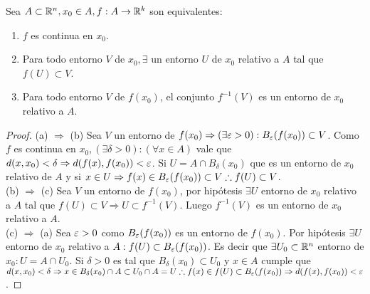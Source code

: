 \begin{prop}
  Sea \(A \subset \mathbb{R}^n, x_0 \in A, f: A \to \mathbb{R}^k\) son equivalentes:
  \begin{enumerate}
    \item \(f\) es continua en \(x_0\).
    \item Para todo entorno \(V\) de \(x_0, \exists \) un entorno \(U\) de \(x_0\) relativo a \(A\) tal que \(f(U) \subset V\).
    \item Para todo entorno \(V\) de \(f(x_0)\), el conjunto \(f^{-1}(V)\) es un entorno de \(x_0\) relativo a \(A\).
  \end{enumerate}

  \begin{proof}
    (a) \(\Rightarrow \) (b) Sea \(V\) un entorno de \(f(x_0) \Rightarrow (\exists \varepsilon > 0) : B_{\varepsilon}(f(x_0)) \subset V\). Como \(f\) es continua en \(x_0, (\exists \delta > 0) : (\forall x \in A)\) vale que \(d(x, x_0) < \delta \Rightarrow d(f(x), f(x_0)) < \varepsilon \). Si \(U = A \cap B_{\delta}(x_0)\) que es un entorno de \(x_0\) relativo de \(A\) y si \(x \in U \Rightarrow f(x) \in B_{\varepsilon}(f(x_0)) \subset V \therefore f(U) \subset V\). \\
    (b) \(\Rightarrow \) (c) Sea \(V\) un entorno de \(f(x_0)\), por hipótesis \(\exists U\) entorno de \(x_0\) relativo a \(A\) tal que \(f(U) \subset V \Rightarrow U \subset f^{-1}(V)\). Luego \(f^{-1}(V)\) es un entorno de \(x_0\) relativo a \(A\). \\
    (c) \(\Rightarrow \) (a) Sea \(\varepsilon > 0\) como \(B_{\varepsilon}(f(x_0))\) es un entorno de \(f(x_0)\). Por hipótesis \(\exists U\) entorno de \(x_0\) relativo a \(A : f(U) \subset B_{\varepsilon}(f(x_0))\). Es decir que \(\exists U_0 \subset \mathbb{R}^n\) entorno de \(x_0 : U = A \cap U_0\). Si \(\delta > 0\) es tal que \(B_{\delta}(x_0) \subset U_0\) y \(x \in A\) cumple que \(d(x, x_0) < \delta \Rightarrow x \in B_{\delta}(x_0) \cap A \subset U_0 \cap A = U \therefore f(x) \in f(U) \subset B_{\varepsilon}(f(x_0))  \Rightarrow d(f(x), f(x_0)) < \varepsilon \).
  \end{proof}
\end{prop}

